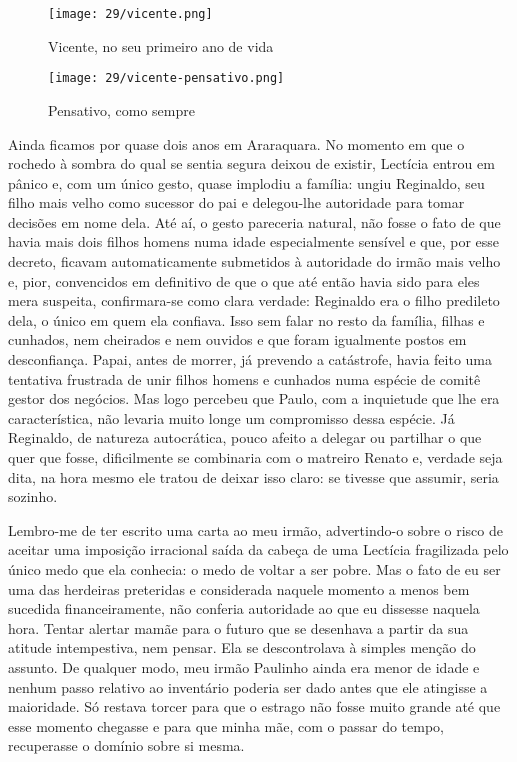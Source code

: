 \begin{figure}
\centering
\texttt{[image: 29/vicente.png]}
\caption{Vicente, no seu primeiro ano de vida}
\end{figure}

\begin{figure}
\centering
\texttt{[image: 29/vicente-pensativo.png]}
\caption{Pensativo, como sempre}
\end{figure}

Ainda ficamos por quase dois anos em Araraquara.
No momento em que o rochedo à sombra do qual se sentia segura deixou de existir, Lectícia entrou em pânico e, com um único gesto, quase implodiu a família: ungiu Reginaldo, seu filho mais velho como sucessor do pai e delegou-lhe autoridade para tomar decisões em nome dela.
Até aí, o gesto pareceria natural, não fosse o fato de que havia mais dois filhos homens numa idade especialmente sensível e que, por esse decreto, ficavam automaticamente submetidos à autoridade do irmão mais velho e, pior, convencidos em definitivo de que o que até então havia sido para eles mera suspeita, confirmara-se como clara verdade: Reginaldo era o filho predileto dela, o único em quem ela confiava.
Isso sem falar no resto da família, filhas e cunhados, nem cheirados e nem ouvidos e que foram igualmente postos em desconfiança.
Papai, antes de morrer, já prevendo a catástrofe, havia feito uma tentativa frustrada de unir filhos homens e cunhados numa espécie de comitê gestor dos negócios.
Mas logo percebeu que Paulo, com a inquietude que lhe era característica, não levaria muito longe um compromisso dessa espécie.
Já Reginaldo, de natureza autocrática, pouco afeito a delegar ou partilhar o que quer que fosse, dificilmente se combinaria com o matreiro Renato e, verdade seja dita, na hora mesmo ele tratou de deixar isso claro: se tivesse que assumir, seria sozinho.

Lembro-me de ter escrito uma carta ao meu irmão, advertindo-o sobre o risco de aceitar uma imposição irracional saída da cabeça de uma Lectícia fragilizada pelo único medo que ela conhecia: o medo de voltar a ser pobre.
Mas o fato de eu ser uma das herdeiras preteridas e considerada naquele momento a menos bem sucedida financeiramente, não conferia autoridade ao que eu dissesse naquela hora.
Tentar alertar mamãe para o futuro que se desenhava a partir da sua atitude intempestiva, nem pensar.
Ela se descontrolava à simples menção do assunto.
De qualquer modo, meu irmão Paulinho ainda era menor de idade e nenhum passo relativo ao inventário poderia ser dado antes que ele atingisse a maioridade.
Só restava torcer para que o estrago não fosse muito grande até que esse momento chegasse e para que minha mãe, com o passar do tempo, recuperasse o domínio sobre si mesma.

